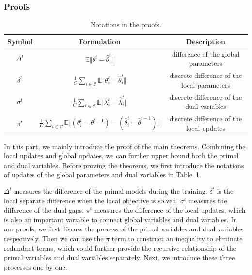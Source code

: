 \subsubsection{Proofs}
\label{ap:proofs of theorem}

\begin{table}[!htbp]
    \caption{Notations in the proofs.}
    \label{ap:proof:notations}
    \centering
    \begin{tabular}{c c c}
		\toprule
		Symbol & Formulation & Description  \\
		\midrule
		$\Delta^t$ & $\mathbb{E}\Vert \theta^{t} - \hat{\theta}^t\Vert$ & difference of the global parameters\\
		$\delta^t$ & $\frac{1}{C}\sum_{i\in\mathcal{C}}\mathbb{E}\Vert \theta_i^t - \hat{\theta}_i^t\Vert$ & discrete difference of the local parameters  \\
        $\sigma^t$ & $\frac{1}{C}\sum_{i\in\mathcal{C}}\mathbb{E}\Vert \lambda_i^t - \hat{\lambda}_i^t\Vert$ & discrete difference of the dual variables\\
        $\pi^t$ & $\frac{1}{C}\sum_{i\in\mathcal{C}}\mathbb{E}\Vert(\theta_i^{t} - \theta^{t-1}) - (\hat{\theta}_i^{t} - \hat{\theta}^{t-1})\Vert$ & discrete difference of the local updates \\
		\bottomrule
    \end{tabular}
\end{table}

In this part, we mainly introduce the proof of the main theorems. Combining the local updates and global updates, we can further upper bound both the primal and dual variables. Before proving the theorems, we first introduce the notations of updates of the global parameters and dual variables in Table~\ref{ap:proof:notations}.

$\Delta^t$ measures the difference of the primal models during the training. $\delta^t$ is the local separate difference when the local objective is solved. $\sigma^t$ measures the difference of the dual gaps. $\pi^t$ measures the difference of the local updates, which is also an important variable to connect global variables and dual variables. In our proofs, we first discuss the process of the primal variables and dual variables respectively. Then we can use the $\pi$ term to construct an inequality to eliminate redundant terms, which could further provide the recursive relationship of the primal variables and dual variables separately. Next, we introduce these three processes one by one.



